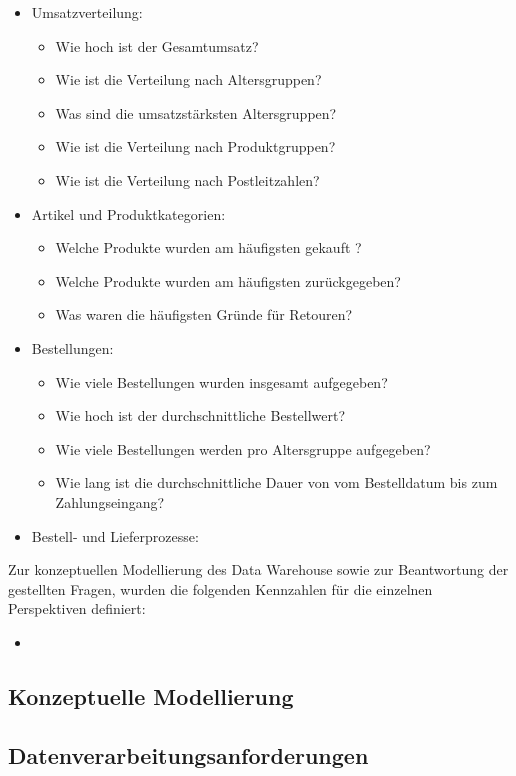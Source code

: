 \begin{itemize}
\begin{itemize}
  	\end{itemize}
  \item Umsatzverteilung:
  	\begin{itemize}
		\item Wie hoch ist der Gesamtumsatz?    	
    	\item Wie ist die Verteilung nach Altersgruppen?
    	\item Was sind die umsatzstärksten Altersgruppen? 
  		\item Wie ist die Verteilung nach Produktgruppen?
  		\item Wie ist die Verteilung nach Postleitzahlen? 
  	\end{itemize}
  \item Artikel und Produktkategorien:
  	\begin{itemize}
  		\item Welche Produkte wurden am häufigsten gekauft ?
  		\item Welche Produkte wurden am häufigsten zurückgegeben?
  		\item Was waren die häufigsten Gründe für Retouren?
  	\end{itemize}
  \item Bestellungen:
  	\begin{itemize}
  		\item Wie viele Bestellungen wurden insgesamt aufgegeben?
  		\item Wie hoch ist der durchschnittliche Bestellwert?
  		\item Wie viele Bestellungen werden pro Altersgruppe aufgegeben?
  		\item Wie lang ist die durchschnittliche Dauer von vom Bestelldatum bis zum Zahlungseingang?
  	\end{itemize}	

    	

  	
  
  
  \item Bestell- und Lieferprozesse:
\end{itemize}


Zur konzeptuellen Modellierung des Data Warehouse sowie zur Beantwortung der gestellten Fragen, wurden die folgenden Kennzahlen für die einzelnen Perspektiven definiert:
\begin{itemize}
  \item 
\end{itemize}

\subsection{Konzeptuelle Modellierung}
\subsection{Datenverarbeitungsanforderungen}
